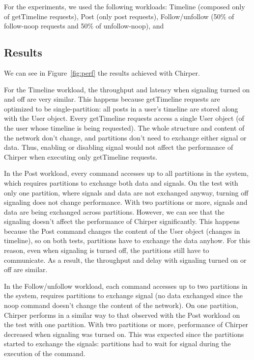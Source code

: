 \documentclass[11pt]{article}
\newcommand{\appname}{Chirper} %
\begin{document}
For the experiments, we used the following workloads:
Timeline (composed only of getTimeline requests),
Post (only post requests),
Follow/unfollow (50\% of follow-noop requests and 50\% of unfollow-noop), and

\label{sec:evaluation:setup}
\subsection{Results}

We can see in Figure~\ref{fig:perf} the results achieved with \appname{}.

For the Timeline workload, the throughput and latency when signaling turned on and off are very similar.
This happens because getTimeline requests are optimized to be single-partition:
all posts in a user's timeline are stored along with the User object.
Every getTimeline requests access a single User object (of the user whose timeline is being requested).
The whole structure and content of the network don't change, and partitions don't need to exchange either signal or data.
Thus, enabling or disabling signal would not affect the performance of \appname{} when executing only getTimeline requests.

In the Post workload, every command accesses up to all partitions in the system, which requires partitions to exchange both data and signals.
On the test with only one partition, where signals and data are not exchanged anyway, turning off signaling does not change performance.
With two partitions or more, signals and data are being exchanged across partitions. However, we can see that the signaling doesn't affect the performance of \appname{} significantly. This happens because the Post command changes the content of the User object (changes in timeline), so on both tests, partitions have to exchange the data anyhow. For this reason, even when signaling is turned off, the partitions still have to communicate. As a result, the throughput and delay with signaling turned on or off are similar.

In the Follow/unfollow workload, each command accesses up to two partitions in the system, requires partitions to exchange signal (no data exchanged since the noop command doesn't change the content of the network).
On one partition, \appname{} performs in a similar way to that observed with the Post workload on the test with one partition.
With two partitions or more, performance of \appname{} decreased when signaling was turned on. This was expected since the partitions started to exchange the signals: partitions had to wait for signal during the execution of the command.
\end{document}
